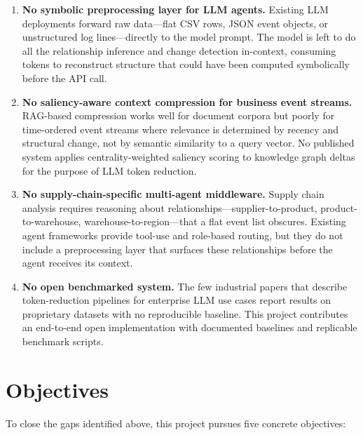 \begin{enumerate}
  \item \textbf{No symbolic preprocessing layer for LLM agents.} Existing LLM deployments
  forward raw data---flat CSV rows, JSON event objects, or unstructured log lines---directly
  to the model prompt. The model is left to do all the relationship inference and change
  detection in-context, consuming tokens to reconstruct structure that could have been
  computed symbolically before the API call.

  \item \textbf{No saliency-aware context compression for business event streams.}
  RAG-based compression works well for document corpora but poorly for time-ordered event
  streams where relevance is determined by recency and structural change, not by semantic
  similarity to a query vector. No published system applies centrality-weighted saliency
  scoring to knowledge graph deltas for the purpose of LLM token reduction.

  \item \textbf{No supply-chain-specific multi-agent middleware.} Supply chain analysis
  requires reasoning about relationships---supplier-to-product, product-to-warehouse,
  warehouse-to-region---that a flat event list obscures. Existing agent frameworks provide
  tool-use and role-based routing, but they do not include a preprocessing layer that
  surfaces these relationships before the agent receives its context.

  \item \textbf{No open benchmarked system.} The few industrial papers that describe
  token-reduction pipelines for enterprise LLM use cases report results on proprietary
  datasets with no reproducible baseline. This project contributes an end-to-end open
  implementation with documented baselines and replicable benchmark scripts.
\end{enumerate}

\section{Objectives}
\label{sec:objectives}

To close the gaps identified above, this project pursues five concrete objectives:

